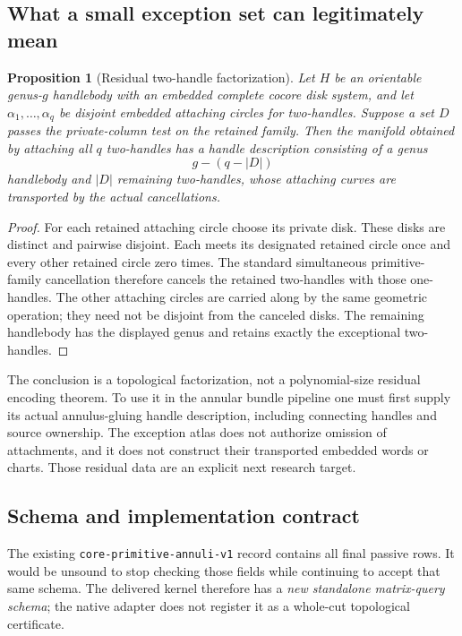 \documentclass[11pt,letterpaper]{article}
\newtheorem{proposition}[theorem]{Proposition}
\theoremstyle{definition}
\begin{document}
\subsection{What a small exception set can legitimately mean}
\begin{proposition}[Residual two-handle factorization]\label{prop:residual}
Let $H$ be an orientable genus-$g$ handlebody with an embedded complete cocore disk system, and let $\alpha_1,\ldots,\alpha_q$ be disjoint embedded attaching circles for two-handles. Suppose a set $D$ passes the private-column test on the retained family. Then the manifold obtained by attaching all $q$ two-handles has a handle description consisting of a genus
\[
 g-(q-|D|)
\]
handlebody and $|D|$ remaining two-handles, whose attaching curves are transported by the actual cancellations.
\end{proposition}
\begin{proof}
For each retained attaching circle choose its private disk. These disks are distinct and pairwise disjoint. Each meets its designated retained circle once and every other retained circle zero times. The standard simultaneous primitive-family cancellation therefore cancels the retained two-handles with those one-handles. The other attaching circles are carried along by the same geometric operation; they need not be disjoint from the canceled disks. The remaining handlebody has the displayed genus and retains exactly the exceptional two-handles.
\end{proof}

The conclusion is a topological factorization, not a polynomial-size residual encoding theorem. To use it in the annular bundle pipeline one must first supply its actual annulus-gluing handle description, including connecting handles and source ownership. The exception atlas does not authorize omission of attachments, and it does not construct their transported embedded words or charts. Those residual data are an explicit next research target.

\subsection{Schema and implementation contract}
The existing \texttt{core-primitive-annuli-v1} record contains all final passive rows. It would be unsound to stop checking those fields while continuing to accept that same schema. The delivered kernel therefore has a \emph{new standalone matrix-query schema}; the native adapter does not register it as a whole-cut topological certificate.
\end{document}
